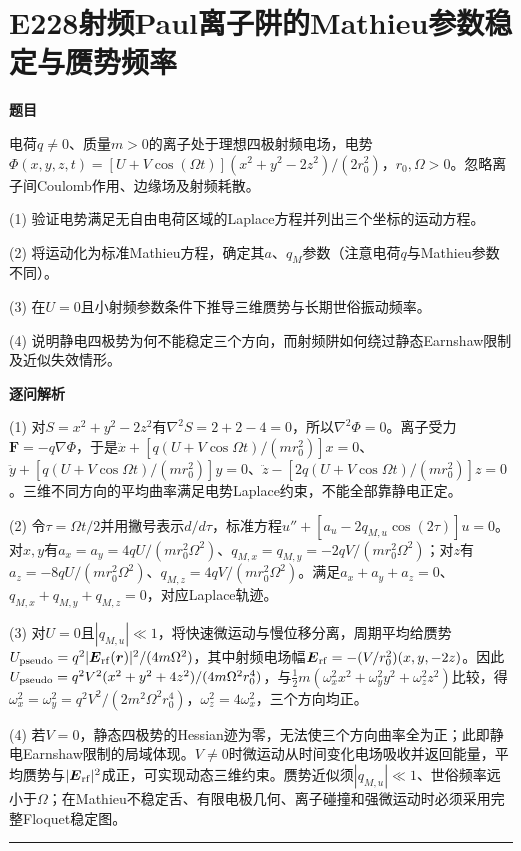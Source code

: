 \documentclass[UTF8,a4paper,11pt,oneside,openany]{ctexbook}
\begin{document}
\section*{E228\quad 射频Paul离子阱的Mathieu参数稳定与赝势频率}
\textbf{题目}\par
电荷$q\ne0$、质量$m>0$的离子处于理想四极射频电场，电势$\Phi(x,y,z,t)=[U+V\cos(\Omega t)](x^2+y^2-2z^2)/(2r_0^2)$，$r_0,\Omega>0$。忽略离子间Coulomb作用、边缘场及射频耗散。
\par\smallskip\noindent (1) 验证电势满足无自由电荷区域的Laplace方程并列出三个坐标的运动方程。
\par\smallskip\noindent (2) 将运动化为标准Mathieu方程，确定其$a$、$q_M$参数（注意电荷$q$与Mathieu参数不同）。
\par\smallskip\noindent (3) 在$U=0$且小射频参数条件下推导三维赝势与长期世俗振动频率。
\par\smallskip\noindent (4) 说明静电四极势为何不能稳定三个方向，而射频阱如何绕过静态Earnshaw限制及近似失效情形。
\par\medskip\textbf{逐问解析}\par
\par\smallskip\noindent (1) 对$S=x^2+y^2-2z^2$有$\nabla^2S=2+2-4=0$，所以$\nabla^2\Phi=0$。离子受力$\boldsymbol F=-q\nabla\Phi$，于是$\ddot x+[q(U+V\cos\Omega t)/(mr_0^2)]x=0$、$\ddot y+[q(U+V\cos\Omega t)/(mr_0^2)]y=0$、$\ddot z-[2q(U+V\cos\Omega t)/(mr_0^2)]z=0$。三维不同方向的平均曲率满足电势Laplace约束，不能全部靠静电正定。
\par\smallskip\noindent (2) 令$\tau=\Omega t/2$并用撇号表示$d/d\tau$，标准方程$u''+[a_u-2q_{M,u}\cos(2\tau)]u=0$。对$x,y$有$a_x=a_y=4qU/(mr_0^2\Omega^2)$、$q_{M,x}=q_{M,y}=-2qV/(mr_0^2\Omega^2)$；对$z$有$a_z=-8qU/(mr_0^2\Omega^2)$、$q_{M,z}=4qV/(mr_0^2\Omega^2)$。满足$a_x+a_y+a_z=0$、$q_{M,x}+q_{M,y}+q_{M,z}=0$，对应Laplace轨迹。
\par\smallskip\noindent (3) 对$U=0$且$|q_{M,u}|\ll1$，将快速微运动与慢位移分离，周期平均给赝势$U_{\rm pseudo}=q^2|\boldsymbol E_{\rm rf}(\boldsymbol r)|^2/(4m\Omega^2)$，其中射频电场幅$\boldsymbol E_{\rm rf}=-(V/r_0^2)(x,y,-2z)$。因此$U_{\rm pseudo}=q^2V^2(x^2+y^2+4z^2)/(4m\Omega^2r_0^4)$，与$\tfrac12m(\omega_x^2x^2+\omega_y^2y^2+\omega_z^2z^2)$比较，得$\omega_x^2=\omega_y^2=q^2V^2/(2m^2\Omega^2r_0^4)$，$\omega_z^2=4\omega_x^2$，三个方向均正。
\par\smallskip\noindent (4) 若$V=0$，静态四极势的Hessian迹为零，无法使三个方向曲率全为正；此即静电Earnshaw限制的局域体现。$V\ne0$时微运动从时间变化电场吸收并返回能量，平均赝势与$|\boldsymbol E_{\rm rf}|^2$成正，可实现动态三维约束。赝势近似须$|q_{M,u}|\ll1$、世俗频率远小于$\Omega$；在Mathieu不稳定舌、有限电极几何、离子碰撞和强微运动时必须采用完整Floquet稳定图。
\par\medskip\hrule\medskip
\end{document}
